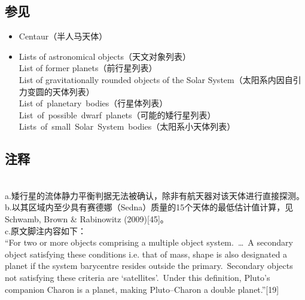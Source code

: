 \subsection{参见}
\begin{itemize}
\item Centaur（半人马天体）\\
\item Lists of astronomical objects（天文对象列表）\\
\quad List of former planets（前行星列表）\\
\quad List of gravitationally rounded objects of the Solar System（太阳系内因自引力变圆的天体列表）\\
\quad List of~planetary~bodies（行星体列表）\\
\quad List~of~possible~dwarf~planets（可能的矮行星列表）\\
\quad Lists~of~small~Solar~System~bodies（太阳系小天体列表）
\end{itemize}

\subsection{注释}\\
a.矮行星的流体静力平衡判据无法被确认，除非有航天器对该天体进行直接探测。\\
b.以其区域内至少具有赛德娜（Sedna）质量的15个天体的最低估计值计算，见 Schwamb, Brown \& Rabinowitz (2009)[45]。\\
c.原文脚注内容如下：\\
“For two or more objects comprising a multiple object system.~…~A secondary object satisfying these conditions i.e. that of mass, shape is also designated a planet if the system barycentre resides outside the primary.~Secondary objects not satisfying these criteria are ‘satellites’.~Under this definition, Pluto’s companion Charon is a planet, making Pluto–Charon a double planet.”[19]




